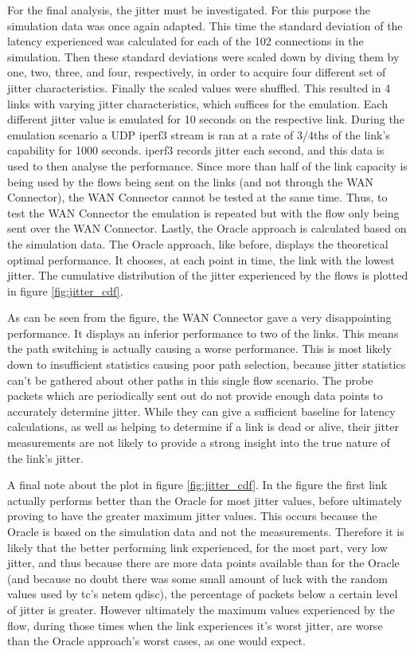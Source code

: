 For the final analysis, the jitter must be investigated. For this purpose the simulation data was once again adapted. This time the standard deviation of the latency experienced was calculated for each of the 102 connections in the simulation. Then these standard deviations were scaled down by diving them by one, two, three, and four, respectively, in order to acquire four different set of jitter characteristics. Finally the scaled values were shuffled. This resulted in 4 links with varying jitter characteristics, which suffices for the emulation. Each different jitter value is emulated for 10 seconds on the respective link. During the emulation scenario a UDP iperf3 stream is ran at a rate of 3/4ths of the link's capability for 1000 seconds. iperf3 records jitter each second, and this data is used to then analyse the performance. Since more than half of the link capacity is being used by the flows being sent on the links (and not through the WAN Connector), the WAN Connector cannot be tested at the same time. Thus, to test the WAN Connector the emulation is repeated but with the flow only being sent over the WAN Connector. Lastly, the Oracle approach is calculated based on the simulation data. The Oracle approach, like before, displays the theoretical optimal performance. It chooses, at each point in time, the link with the lowest jitter. The cumulative distribution of the jitter experienced by the flows is plotted in figure \ref{fig:jitter_cdf}. 

As can be seen from the figure, the WAN Connector gave a very disappointing performance. It displays an inferior performance to two of the links. This means the path switching is actually causing a worse performance. This is most likely down to insufficient statistics causing poor path selection, because jitter statistics can't be gathered about other paths in this single flow scenario. The probe packets which are periodically sent out do not provide enough data points to accurately determine jitter. While they can give a sufficient baseline for latency calculations, as well as helping to determine if a link is dead or alive, their jitter measurements are not likely to provide a strong insight into the true nature of the link's jitter.

A final note about the plot in figure \ref{fig:jitter_cdf}. In the figure the first link actually performs better than the Oracle for most jitter values, before ultimately proving to have the greater maximum jitter values. This occurs because the Oracle is based on the simulation data and not the measurements. Therefore it is likely that the better performing link experienced, for the most part, very low jitter, and thus because there are more data points available than for the Oracle (and because no doubt there was some small amount of luck with the random values used by tc's netem qdisc), the percentage of packets below a certain level of jitter is greater. However ultimately the maximum values experienced by the flow, during those times when the link experiences it's worst jitter, are worse than the Oracle approach's worst cases, as one would expect.


